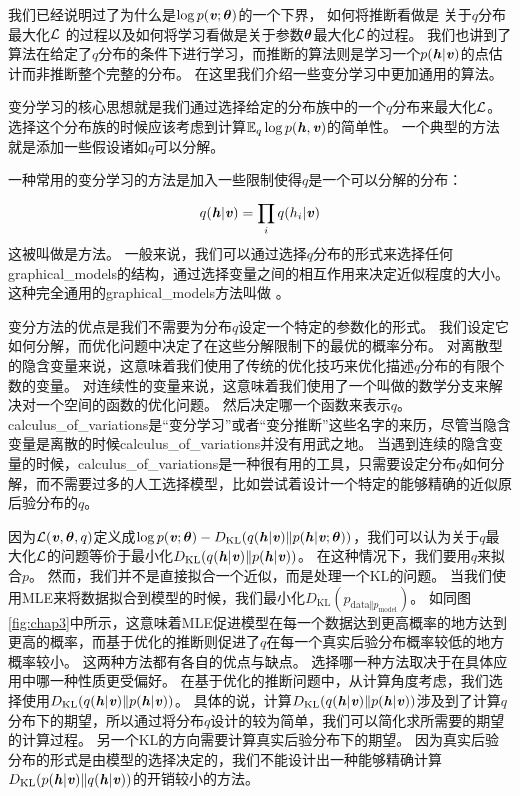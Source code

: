 我们已经说明过了为什么是$\log  p(\boldsymbol{\mathit{v}};\boldsymbol{\theta})$的一个下界， 如何将推断看做是 关于$q$分布最大化$\mathcal{L}$ 的过程以及如何将学习看做是关于参数$\boldsymbol{\theta}$最大化$\mathcal{L}$的过程。
我们也讲到了算法在给定了$q$分布的条件下进行学习，而推断的算法则是学习一个$p(\boldsymbol{\mathit{h}} \vert \boldsymbol{\mathit{v}})$的点估计而非推断整个完整的分布。
在这里我们介绍一些变分学习中更加通用的算法。


变分学习的核心思想就是我们通过选择给定的分布族中的一个$q$分布来最大化$\mathcal{L}$。
选择这个分布族的时候应该考虑到计算$\mathbb{E}_q \log p(\boldsymbol{\mathit{h}},\boldsymbol{\mathit{v}})$的简单性。
一个典型的方法就是添加一些假设诸如$q$可以分解。


一种常用的变分学习的方法是加入一些限制使得$q$是一个可以分解的分布：
\begin{align}
	q(\boldsymbol{\mathit{h}}\vert\boldsymbol{\mathit{v}}) = \prod_{i}^{}q(h_i \vert \boldsymbol{\mathit{v}})
\end{align}
这被叫做是方法。
一般来说，我们可以通过选择$q$分布的形式来选择任何\gls{graphical_models}的结构，通过选择变量之间的相互作用来决定近似程度的大小。
这种完全通用的\gls{graphical_models}方法叫做 \citep{Saul96}。


变分方法的优点是我们不需要为分布$q$设定一个特定的参数化的形式。
我们设定它如何分解，而优化问题中决定了在这些分解限制下的最优的概率分布。
对离散型的隐含变量来说，这意味着我们使用了传统的优化技巧来优化描述$q$分布的有限个数的变量。
对连续性的变量来说，这意味着我们使用了一个叫做的数学分支来解决对一个空间的函数的优化问题。
然后决定哪一个函数来表示$q$。
\gls{calculus_of_variations}是“变分学习”或者“变分推断”这些名字的来历，尽管当隐含变量是离散的时候\gls{calculus_of_variations}并没有用武之地。
当遇到连续的隐含变量的时候，\gls{calculus_of_variations}是一种很有用的工具，只需要设定分布$q$如何分解，而不需要过多的人工选择模型，比如尝试着设计一个特定的能够精确的近似原后验分布的$q$。


因为$\mathcal{L}(\boldsymbol{\mathit{v}},\boldsymbol{\theta},q)$定义成$\log p(\boldsymbol{\mathit{v}};\boldsymbol{\theta}) - D_{\text{KL}}(q(\boldsymbol{\mathit{h}}\vert\boldsymbol{\mathit{v}})\Vert p(\boldsymbol{\mathit{h}}\vert\boldsymbol{\mathit{v}};\boldsymbol{\theta}))$，我们可以认为关于$q$最大化$\mathcal{L}$的问题等价于最小化$D_{\text{KL}}(q(\boldsymbol{\mathit{h}}\vert\boldsymbol{\mathit{v}})\Vert p(\boldsymbol{\mathit{h}}\vert\boldsymbol{\mathit{v}}))$。
在这种情况下，我们要用$q$来拟合$p$。
然而，我们并不是直接拟合一个近似，而是处理一个\gls{KL}的问题。
当我们使用\gls{MLE}来将数据拟合到模型的时候，我们最小化$D_{\text{KL}}(p_{\text{data}\Vert p_{\text{model}}})$。
如同图\ref{fig:chap3}中所示，这意味着\gls{MLE}促进模型在每一个数据达到更高概率的地方达到更高的概率，而基于优化的推断则促进了$q$在每一个真实后验分布概率较低的地方概率较小。
这两种方法都有各自的优点与缺点。
选择哪一种方法取决于在具体应用中哪一种性质更受偏好。
在基于优化的推断问题中，从计算角度考虑，我们选择使用$D_{\text{KL}}(q(\boldsymbol{\mathit{h}}\vert\boldsymbol{\mathit{v}})\Vert p(\boldsymbol{\mathit{h}}\vert\boldsymbol{\mathit{v}}))$。
具体的说，计算$D_{\text{KL}}(q(\boldsymbol{\mathit{h}}\vert\boldsymbol{\mathit{v}})\Vert p(\boldsymbol{\mathit{h}}\vert\boldsymbol{\mathit{v}}))$涉及到了计算$q$分布下的期望，所以通过将分布$q$设计的较为简单，我们可以简化求所需要的期望的计算过程。
另一个\gls{KL}的方向需要计算真实后验分布下的期望。
因为真实后验分布的形式是由模型的选择决定的，我们不能设计出一种能够精确计算$D_{\text{KL}}(p(\boldsymbol{\mathit{h}}\vert\boldsymbol{\mathit{v}}) \Vert q(\boldsymbol{\mathit{h}}\vert\boldsymbol{\mathit{v}}))$的开销较小的方法。




